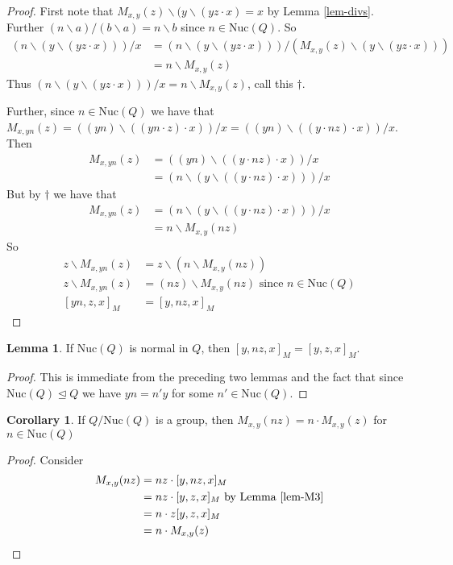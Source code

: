 \documentclass[12pt, twoside, openright]{report}
\theoremstyle{definition}
\newtheorem{lem}[thm]{Lemma}
\newtheorem{cor}[thm]{Corollary}
\newcommand{\ldv}{\backslash}       %
\newcommand{\rdv}{/}                %
\newcommand{\nuc}{\text{Nuc}}       %
\begin{document}
\begin{proof}
  First note that $M_{x, y}(z)\ldv(y\ldv(yz\cdot x) = x$ by Lemma \ref{lem-divs}.
    Further $(n\ldv a)\rdv(b\ldv a) = n\ldv b$ since $n\in\nuc(Q)$. So
  \begin{align*}
    (n\ldv (y\ldv(yz\cdot x)))\rdv x &= (n\ldv (y\ldv(yz\cdot x)))\rdv(M_{x, y}(z)\ldv (y\ldv(yz\cdot x)))\\
    &= n\ldv M_{x, y}(z)
  \end{align*}
  Thus $(n\ldv (y\ldv(yz\cdot x)))\rdv x = n\ldv M_{x, y}(z)$, call this $\dagger$.

  Further, since $n\in \nuc(Q)$ we have that
    $M_{x, yn}(z) = ((yn)\ldv((yn\cdot z)\cdot x))\rdv x = ((yn)\ldv((y\cdot nz)\cdot x))\rdv x$.
    Then
  \begin{align*}
    M_{x, yn}(z) &= ((yn)\ldv((y\cdot nz)\cdot x))\rdv x\\
    &= (n\ldv(y\ldv((y\cdot nz)\cdot x)))\rdv x
  \end{align*}
  But by $\dagger$ we have that
  \begin{align*}
    M_{x, yn}(z) &= (n\ldv(y\ldv((y\cdot nz)\cdot x)))\rdv x\\
    &= n\ldv M_{x, y}(nz)
  \end{align*}
  So
  \begin{align*}
    z\ldv M_{x, yn}(z) &= z\ldv(n\ldv M_{x, y}(nz))\\
    z\ldv M_{x, yn}(z) &= (nz)\ldv M_{x, y}(nz)\text{ since $n\in\nuc(Q)$}\\
    [yn, z, x]_M &= [y, nz, x]_M
  \end{align*}
\end{proof}

\begin{lem}\label{lem-M3}
  If $\nuc(Q)$ is normal in $Q$, then $[y, nz, x]_M = [y, z, x]_M$.
\end{lem}

\begin{proof}
  This is immediate from the preceding two lemmas and the fact that since $\nuc(Q)\unlhd Q$
    we have $yn = n'y$ for some $n'\in\nuc(Q)$.
\end{proof}

\begin{cor}\label{cor-M}
  If $Q/\nuc(Q)$ is a group, then $M_{x, y}(nz) = n\cdot M_{x, y}(z)$ for $n\in\nuc(Q)$
\end{cor}

\begin{proof}
  Consider
  \begin{align*}
    M_{x, y}(nz) &= nz\cdot [y, nz, x]_M\\
    &= nz\cdot [y, z, x]_M\text{ by Lemma \ref{lem-M3}}\\
    &= n\cdot z[y, z, x]_M\\
    &= n\cdot M_{x, y}(z)
  \end{align*}
\end{proof}
\end{document}

